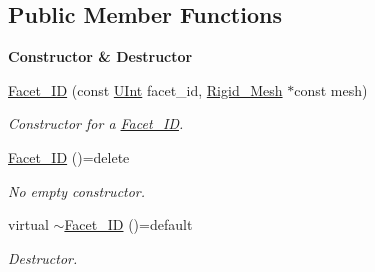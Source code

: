 \subsection*{Public Member Functions}
\begin{Indent}{\bf Constructor \& Destructor}\par
\begin{DoxyCompactItemize}
\item 
\hyperlink{classFVCode3D_1_1Rigid__Mesh_1_1Facet__ID_aa5ddf57f99a7e9f42327e8dfcd15b2bf}{Facet\+\_\+\+ID} (const \hyperlink{namespaceFVCode3D_a4bf7e328c75d0fd504050d040ebe9eda}{U\+Int} facet\+\_\+id, \hyperlink{classFVCode3D_1_1Rigid__Mesh}{Rigid\+\_\+\+Mesh} $\ast$const mesh)
\begin{DoxyCompactList}\small\item\em Constructor for a \hyperlink{classFVCode3D_1_1Rigid__Mesh_1_1Facet__ID}{Facet\+\_\+\+ID}. \end{DoxyCompactList}\item 
\hyperlink{classFVCode3D_1_1Rigid__Mesh_1_1Facet__ID_a308cbae2f61ee7ef4507f2ceec063ee9}{Facet\+\_\+\+ID} ()=delete
\begin{DoxyCompactList}\small\item\em No empty constructor. \end{DoxyCompactList}\item 
virtual \hyperlink{classFVCode3D_1_1Rigid__Mesh_1_1Facet__ID_a6429f6226371828b41b5e947868e26e6}{$\sim$\+Facet\+\_\+\+ID} ()=default
\begin{DoxyCompactList}\small\item\em Destructor. \end{DoxyCompactList}\end{DoxyCompactItemize}
\end{Indent}
